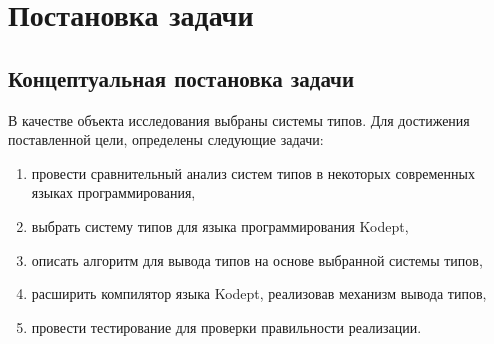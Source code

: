 \chapter{Постановка задачи}
\label{ch:task}


\section{Концептуальная постановка задачи}
\label{sec:abstract_task}

В качестве объекта исследования выбраны системы типов.
Для достижения поставленной цели, определены следующие задачи:

\begin{enumerate}[1)]
    \item провести сравнительный анализ систем типов в некоторых современных языках программирования,
    \item выбрать систему типов для языка программирования Kodept,
    \item описать алгоритм для вывода типов на основе выбранной системы типов,
    \item расширить компилятор языка Kodept, реализовав механизм вывода типов,
    \item провести тестирование для проверки правильности реализации.
\end{enumerate}

